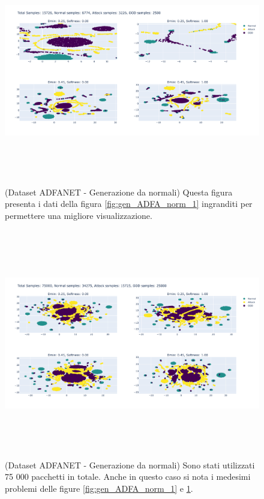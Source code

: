 \begin{figure}[htpb]
    \centering
    \includegraphics[width=\textwidth,height=10cm,keepaspectratio=true]{img/gen_test/adfa/ADFANET_normal_only_reduced_ood_zoomed.png}
    \caption{
      (Dataset ADFANET - Generazione da normali) Questa figura presenta i dati della figura \ref{fig:gen_ADFA_norm_1} ingranditi per permettere una migliore visualizzazione.
    }
    \label{fig:gen_ADFA_norm_1_zoomed}
\end{figure}


\begin{figure}[htpb]
    \centering
    \includegraphics[width=\textwidth,height=10cm,keepaspectratio=true]{img/gen_test/adfa/ADFANET_normal_only_25k_ood.png}
    \caption{
      (Dataset ADFANET - Generazione da normali) Sono stati utilizzati 75 000 pacchetti in totale. Anche in questo caso si nota i medesimi problemi delle figure \ref{fig:gen_ADFA_norm_1} e \ref{fig:gen_ADFA_norm_1_zoomed}.
    }
    \label{fig:gen_ADFA_norm_2}
\end{figure}


